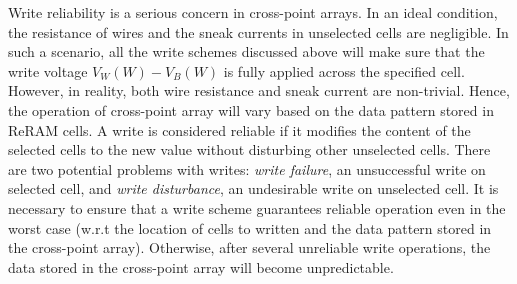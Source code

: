Write reliability is a serious concern in cross-point arrays. In an ideal
condition, the resistance of wires and the sneak currents in unselected
cells are negligible. In such a scenario, all the write schemes discussed
above will make sure that the write voltage $V_W(W)-V_B(W)$ is fully
applied across the specified cell. However, in reality, both wire
resistance and sneak current are non-trivial. Hence, the operation of
cross-point array will vary based on the data pattern stored in ReRAM
cells. A write is considered reliable if it modifies the content of the
selected cells to the new value without disturbing other unselected cells.
There are two potential problems with writes: \emph{write failure}, an
unsuccessful write on selected cell, and \emph{write disturbance}, an
undesirable write on unselected cell. It is necessary to ensure that a
write scheme guarantees reliable operation even in the worst case (w.r.t
the location of cells to written and the data pattern stored in the
cross-point array). Otherwise, after several unreliable write operations,
the data stored in the cross-point array will become unpredictable.

